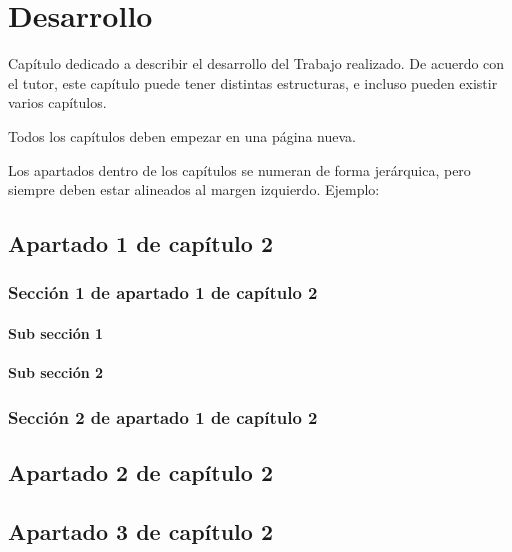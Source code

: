 \chapter{Desarrollo}
Capítulo dedicado a describir el desarrollo del Trabajo realizado. De acuerdo con el tutor, este capítulo puede tener distintas estructuras, e incluso pueden existir varios capítulos.

Todos los capítulos deben empezar en una página nueva.

Los apartados dentro de los capítulos se numeran de forma jerárquica, pero siempre deben estar alineados al margen izquierdo\cite{StreamGenerator}. Ejemplo:

\section{Apartado 1 de capítulo 2}

\subsection{Sección 1 de apartado 1 de capítulo 2}

\subsubsection{Sub sección 1}

\subsubsection{Sub sección 2}

\subsection{Sección 2 de apartado 1 de capítulo 2}

\section{Apartado 2 de capítulo 2}

\section{Apartado 3 de capítulo 2}
